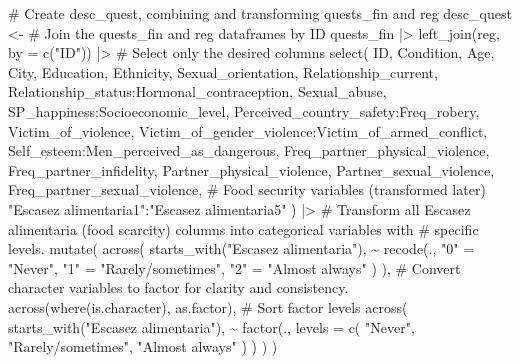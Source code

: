 \documentclass[
  bookmarksnumbered]{article}
\newenvironment{Shaded}{\begin{snugshade}}{\end{snugshade}}
\newcommand{\AttributeTok}[1]{\textcolor[rgb]{0.80,0.80,0.80}{#1}}
\newcommand{\CommentTok}[1]{\textcolor[rgb]{0.50,0.62,0.50}{#1}}
\newcommand{\FunctionTok}[1]{\textcolor[rgb]{0.94,0.94,0.56}{#1}}
\newcommand{\NormalTok}[1]{\textcolor[rgb]{0.80,0.80,0.80}{#1}}
\newcommand{\OtherTok}[1]{\textcolor[rgb]{0.94,0.94,0.56}{#1}}
\newcommand{\SpecialCharTok}[1]{\textcolor[rgb]{0.86,0.64,0.64}{#1}}
\newcommand{\StringTok}[1]{\textcolor[rgb]{0.80,0.58,0.58}{#1}}
\begin{document}
\begin{Shaded}
\begin{Highlighting}[]
\CommentTok{\# Create desc\_quest, combining and transforming quests\_fin and reg}
\NormalTok{desc\_quest }\OtherTok{\textless{}{-}}
  \CommentTok{\# Join the quests\_fin and reg dataframes by ID}
\NormalTok{  quests\_fin }\SpecialCharTok{|\textgreater{}}
  \FunctionTok{left\_join}\NormalTok{(reg, }\AttributeTok{by =} \FunctionTok{c}\NormalTok{(}\StringTok{"ID"}\NormalTok{)) }\SpecialCharTok{|\textgreater{}}
  \CommentTok{\# Select only the desired columns}
  \FunctionTok{select}\NormalTok{(}
\NormalTok{    ID,}
\NormalTok{    Condition,}
\NormalTok{    Age,}
\NormalTok{    City,}
\NormalTok{    Education,}
\NormalTok{    Ethnicity,}
\NormalTok{    Sexual\_orientation,}
\NormalTok{    Relationship\_current,}
\NormalTok{    Relationship\_status}\SpecialCharTok{:}\NormalTok{Hormonal\_contraception,}
\NormalTok{    Sexual\_abuse,}
\NormalTok{    SP\_happiness}\SpecialCharTok{:}\NormalTok{Socioeconomic\_level,}
\NormalTok{    Perceived\_country\_safety}\SpecialCharTok{:}\NormalTok{Freq\_robery,}
\NormalTok{    Victim\_of\_violence,}
\NormalTok{    Victim\_of\_gender\_violence}\SpecialCharTok{:}\NormalTok{Victim\_of\_armed\_conflict,}
\NormalTok{    Self\_esteem}\SpecialCharTok{:}\NormalTok{Men\_perceived\_as\_dangerous,}
\NormalTok{    Freq\_partner\_physical\_violence,}
\NormalTok{    Freq\_partner\_infidelity,}
\NormalTok{    Partner\_physical\_violence,}
\NormalTok{    Partner\_sexual\_violence,}
\NormalTok{    Freq\_partner\_sexual\_violence,}
    \CommentTok{\# Food security variables (transformed later)}
    \StringTok{"Escasez alimentaria1"}\SpecialCharTok{:}\StringTok{"Escasez alimentaria5"}
\NormalTok{  ) }\SpecialCharTok{|\textgreater{}}
  \CommentTok{\# Transform all \textquotesingle{}Escasez alimentaria\textquotesingle{} (food scarcity) columns into categorical variables with }
  \CommentTok{\# specific levels.}
  \FunctionTok{mutate}\NormalTok{(}
    \FunctionTok{across}\NormalTok{(}
      \FunctionTok{starts\_with}\NormalTok{(}\StringTok{"Escasez alimentaria"}\NormalTok{),}
      \SpecialCharTok{\textasciitilde{}} \FunctionTok{recode}\NormalTok{(.,}
        \StringTok{"0"} \OtherTok{=} \StringTok{"Never"}\NormalTok{,}
        \StringTok{"1"} \OtherTok{=} \StringTok{"Rarely/sometimes"}\NormalTok{,}
        \StringTok{"2"} \OtherTok{=} \StringTok{"Almost always"}
\NormalTok{      )}
\NormalTok{    ),}
    \CommentTok{\# Convert character variables to factor for clarity and consistency.}
    \FunctionTok{across}\NormalTok{(}\FunctionTok{where}\NormalTok{(is.character), as.factor),}
    \CommentTok{\# Sort factor levels}
    \FunctionTok{across}\NormalTok{(}
      \FunctionTok{starts\_with}\NormalTok{(}\StringTok{"Escasez alimentaria"}\NormalTok{),}
      \SpecialCharTok{\textasciitilde{}} \FunctionTok{factor}\NormalTok{(.,}
        \AttributeTok{levels =} \FunctionTok{c}\NormalTok{(}
          \StringTok{"Never"}\NormalTok{,}
          \StringTok{"Rarely/sometimes"}\NormalTok{,}
          \StringTok{"Almost always"}
\NormalTok{        )}
\NormalTok{      )}
\NormalTok{    )}
\NormalTok{  )}
\end{Highlighting}
\end{Shaded}
\end{document}
